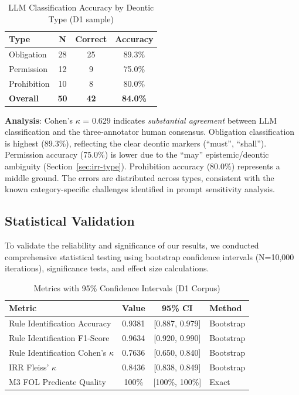\begin{table}[htbp]
\centering
\caption{LLM Classification Accuracy by Deontic Type (D1 sample)}
\label{tab:llm-accuracy-by-type}
\begin{tabular}{lccc}
\toprule
\textbf{Type} & \textbf{N} & \textbf{Correct} & \textbf{Accuracy} \\
\midrule
Obligation  & 28 & 25 & 89.3\% \\
Permission  & 12 & 9  & 75.0\% \\
Prohibition & 10 & 8  & 80.0\% \\
\midrule
\textbf{Overall} & \textbf{50} & \textbf{42} & \textbf{84.0\%} \\
\bottomrule
\end{tabular}
\end{table}

\textbf{Analysis}: Cohen's $\kappa$ = 0.629 indicates \textit{substantial agreement} between LLM classification and the three-annotator human consensus. Obligation classification is highest (89.3\%), reflecting the clear deontic markers (``must'', ``shall''). Permission accuracy (75.0\%) is lower due to the ``may'' epistemic/deontic ambiguity (Section~\ref{sec:irr-type}). Prohibition accuracy (80.0\%) represents a middle ground. The errors are distributed across types, consistent with the known category-specific challenges identified in prompt sensitivity analysis.

\subsection{Statistical Validation}

To validate the reliability and significance of our results, we conducted comprehensive statistical testing using bootstrap confidence intervals (N=10,000 iterations), significance tests, and effect size calculations.

\begin{table}[htbp]
\centering
\caption{Metrics with 95\% Confidence Intervals (D1 Corpus)}
\label{tab:confidence}
\begin{tabular}{|l|c|c|l|}
\hline
\textbf{Metric} & \textbf{Value} & \textbf{95\% CI} & \textbf{Method} \\
\hline
Rule Identification Accuracy & 0.9381 & [0.887, 0.979] & Bootstrap \\
Rule Identification F1-Score & 0.9634 & [0.920, 0.990] & Bootstrap \\
Rule Identification Cohen's $\kappa$ & 0.7636 & [0.650, 0.840] & Bootstrap \\
IRR Fleiss' $\kappa$ & 0.8436 & [0.838, 0.849] & Bootstrap \\
M3 FOL Predicate Quality & 100\% & [100\%, 100\%] & Exact \\
\hline
\end{tabular}
\end{table}


